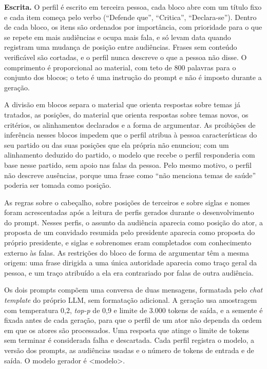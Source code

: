 \textbf{Escrita.} O perfil é escrito em terceira pessoa, cada bloco abre com um título fixo e cada
item começa pelo verbo (``Defende que'', ``Critica'', ``Declara-se''). Dentro de cada bloco, os
itens são ordenados por importância, com prioridade para o que se repete em mais audiências e ocupa
mais fala, e só levam data quando registram uma mudança de posição entre audiências. Frases sem
conteúdo verificável são cortadas, e o perfil nunca descreve o que a pessoa não disse. O comprimento
é proporcional ao material, com teto de 800 palavras para o conjunto dos blocos; o teto é uma
instrução do prompt e não é imposto durante a geração.

A divisão em blocos separa o material que orienta respostas sobre temas já tratados, as posições, do
material que orienta respostas sobre temas novos, os critérios, os alinhamentos declarados e a forma
de argumentar. As proibições de inferência nesses blocos impedem que o perfil atribua à pessoa
características do seu partido ou das suas posições que ela própria não enunciou; com um alinhamento
deduzido do partido, o modelo que recebe o perfil responderia com base nesse partido, sem apoio nas
falas da pessoa. Pelo mesmo motivo, o perfil não descreve ausências, porque uma frase como ``não
menciona temas de saúde'' poderia ser tomada como posição.

As regras sobre o cabeçalho, sobre posições de terceiros e sobre siglas e nomes foram acrescentadas
após a leitura de perfis gerados durante o desenvolvimento do prompt. Nesses perfis, o assunto da
audiência aparecia como posição do ator, a proposta de um convidado resumida pelo presidente
aparecia como proposta do próprio presidente, e siglas e sobrenomes eram completados com
conhecimento externo às falas. As restrições do bloco de forma de argumentar têm a mesma origem: uma
frase dirigida a uma única autoridade aparecia como traço geral da pessoa, e um traço atribuído a
ela era contrariado por falas de outra audiência.

Os dois prompts compõem uma conversa de duas mensagens, formatada pelo \textit{chat template} do
próprio LLM, sem formatação adicional. A geração usa amostragem com temperatura 0,2, \textit{top-p} de 0,9 e limite de
3.000 tokens de saída, e a semente é fixada antes de cada geração, para que o perfil de um ator não
dependa da ordem em que os atores são processados. Uma resposta que atinge o limite de tokens sem
terminar é considerada falha e descartada. Cada perfil registra o modelo, a versão dos prompts, as
audiências usadas e o número de tokens de entrada e de saída. O modelo gerador é <modelo>.

